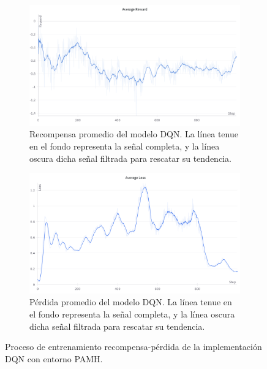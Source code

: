 \begin{figure}[hh]
    \centering
    \begin{subfigure}[b]{0.6\textwidth}
        \centering
        \includegraphics[width=\textwidth]{fig/new/DQNentrenados.png}
        \caption{Recompensa promedio del modelo DQN. La línea tenue en el fondo representa la señal completa, y la línea oscura dicha señal filtrada para rescatar su tendencia.}
        \label{fig:RewspromDQN}
    \end{subfigure}
    \hfill
    \begin{subfigure}[b]{0.6\textwidth}
        \centering
        \includegraphics[width=\textwidth]{fig/new/DQNperdida.png}
        \caption{Pérdida promedio del modelo DQN. La línea tenue en el fondo representa la señal completa, y la línea oscura dicha señal filtrada para rescatar su tendencia.}
        \label{fig:LosspromDQN}
    \end{subfigure}
    \caption{Proceso de entrenamiento recompensa-pérdida de la implementación DQN con entorno PAMH.}
    \label{fig:PromDQN}
\end{figure}

